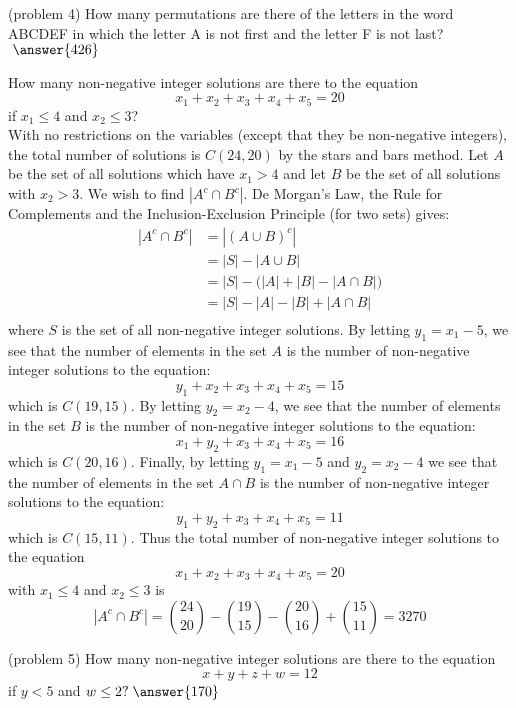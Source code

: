 \documentclass[handout]{ximera}
\begin{document}
\begin{problem}(problem 4)
How many permutations are there of the letters in the word ABCDEF in which the letter A is not 
first and the letter F is not last? $\; \answer{426}$
\end{problem}



\begin{example}[example 5]
How many non-negative integer solutions are there to the equation
\[
x_1 + x_2 + x_3 + x_4 + x_5 = 20
\]
if $x_1 \leq 4$ and $x_2 \leq 3$?\\
With no restrictions on the variables (except that they be non-negative integers), 
the total number of solutions is $C(24, 20)$ by the stars and bars method.
Let $A$ be the set of all solutions which have $x_1 > 4$ and let $B$ be the set of all solutions with $x_2 > 3$.
We wish to find $|A^c \cap B^c|$.
De Morgan's Law, the Rule for Complements and the Inclusion-Exclusion Principle (for two sets) gives:
\begin{align*}
|A^c \cap B^c| &= |(A \cup B)^c|\\
               &= |S| - |A\cup B|\\
               &= |S| - \Big(|A| + |B| - |A\cap B|\Big)\\
               &= |S| - |A| - |B| + |A\cap B|\\
\end{align*}
where $S$ is the set of all non-negative integer solutions. By letting $y_1 = x_1 -5$, we see that 
the number of elements in the set $A$
is the number of non-negative integer solutions to the equation:
\[
y_1 + x_2 + x_3 + x_4 + x_5 = 15
\]
which is $C(19, 15)$. By letting $y_2 = x_2 -4$, we see that the number of elements in the set $B$
is the number of non-negative integer solutions to the equation:
\[
x_1 + y_2 + x_3 + x_4 + x_5 = 16
\]
which is $C(20, 16)$. Finally, by letting $y_1 = x_1 -5$ and $y_2 = x_2 -4$ we see that the number of 
elements in the set $A \cap B$
is the number of non-negative integer solutions to the equation:
\[
y_1 + y_2 + x_3 + x_4 + x_5 = 11
\]
which is $C(15, 11)$. 
Thus the total number of non-negative integer solutions to the equation
\[
x_1 + x_2 + x_3 + x_4 + x_5 = 20
\]
with $x_1 \leq 4$ and $x_2 \leq 3$ is
\[
|A^c \cap B^c| = \binom{24}{20} - \binom{19}{15} - \binom{20}{16} + \binom{15}{11} = 3270
\]

\end{example}


\begin{problem}(problem 5)
How many non-negative integer solutions are there to the equation
\[
x + y + z + w = 12
\]
if $y < 5$ and $w \leq 2 ? \; \answer{170}$

\end{problem}
\end{document}
